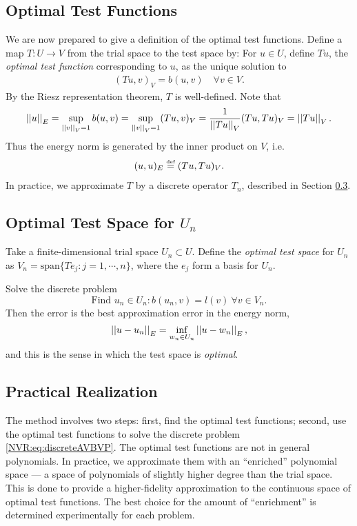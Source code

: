 \subsection{Optimal Test Functions}
We are now prepared to give a definition of the optimal test functions.  Define a map $T:U \rightarrow V$ from the trial space to the test space by: For $u \in U$, define $Tu$, the \emph{optimal test function} corresponding to $u$, as the unique solution to 
\begin{align*}
(Tu,v)_{V} = b(u,v) \quad \forall v \in V.
\end{align*}
By the Riesz representation theorem, $T$ is well-defined.  Note that 
\begin{align*}
\NVRnorm{u}_{E} = \sup_{\NVRnorm{v}_{V}=1} b(u,v) = \sup_{\NVRnorm{v}_{V}=1} (Tu,v)_{V} = \frac{1}{\NVRnorm{Tu}_{V}} (Tu, Tu)_{V} = \NVRnorm{Tu}_{V}.
\end{align*}
Thus the energy norm is generated by the inner product on $V$, i.e.\ 
\begin{equation}
(u,u)_{E} \NVReqdef (Tu,Tu)_{V}.\label{NVR:eq:ipEqualsEnergy}
\end{equation}
In practice, we approximate $T$ by a discrete operator $T_{n}$, described in Section \ref{NVR:sec:practicalRealization}.
\subsection{Optimal Test Space for $U_{n}$}
Take a finite-dimensional trial space $U_{n} \subset U$.  Define the \emph{optimal test space} for $U_{n}$ as $V_{n} = \text{span} \{Te_{j} : j=1,\cdots,n\}$, where the $e_{j}$ form a basis for $U_{n}$.

Solve the discrete problem
\begin{equation}
\text{Find } u_{n} \in U_{n} : b(u_{n}, v) = l(v) \ \forall v \in V_{n}. \label{NVR:eq:discreteAVBVP}
\end{equation}
Then the error is the best approximation error in the energy norm,
\begin{align}
\NVRnorm{u-u_{n}}_{E} = \inf_{w_{n} \in U_{n}} \NVRnorm{u-w_{n}}_{E},\label{NVR:eq:optimalityEqn}
\end{align}
and this is the sense in which the test space is \emph{optimal}.

\subsection{Practical Realization}\label{NVR:sec:practicalRealization}
The method involves two steps: first, find the optimal test functions; second, use the optimal test functions to solve the discrete problem \ref{NVR:eq:discreteAVBVP}.  The optimal test functions are not in general polynomials.  In practice, we approximate them with an ``enriched'' polynomial space --- a space of polynomials of slightly higher degree than the trial space.  This is done to provide a higher-fidelity approximation to the continuous space of optimal test functions.  The best choice for the amount of ``enrichment'' is determined experimentally for each problem.


